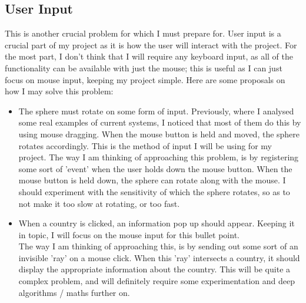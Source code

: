 \subsection{User Input}
This is another crucial problem for which I must prepare for. User input is a crucial part of my project as it is how the user will interact with the project. For the most part, I don't think that I will require any keyboard input, as all of the functionality can be available with just the mouse; this is useful as I can just focus on mouse input, keeping my project simple.
Here are some proposals on how I may solve this problem:
\begin{itemize}
\item The sphere must rotate on some form of input. Previously, where I analysed some real examples of current systems, I noticed that most of them do this by using mouse dragging. When the mouse button is held and moved, the sphere rotates accordingly. This is the method of input I will be using for my project. The way I am thinking of approaching this problem, is by registering some sort of 'event' when the user holds down the mouse button. When the mouse button is held down, the sphere can rotate along with the mouse. I should experiment with the sensitivity of which the sphere rotates, so as to not make it too slow at rotating, or too fast.

\item When a country is clicked, an information pop up should appear. Keeping it in topic, I will focus on the mouse input for this bullet point. \\
The way I am thinking of approaching this, is by sending out some sort of an invisible 'ray' on a mouse click. When this 'ray' intersects a country, it should display the appropriate information about the country. This will be quite a complex problem, and will definitely require some experimentation and deep algorithms / maths further on.
\end{itemize}

